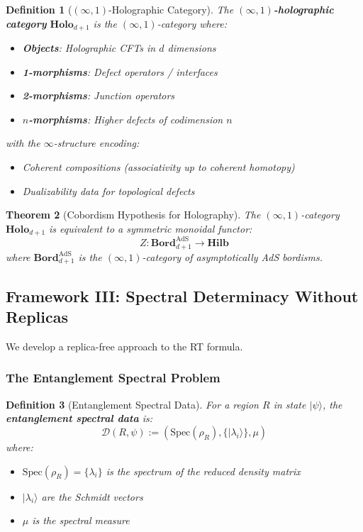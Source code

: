 \documentclass[12pt,a4paper]{article}
\newtheorem{theorem}{Theorem}[section]
\newtheorem{definition}[theorem]{Definition}
\begin{document}
\begin{definition}[$(\infty,1)$-Holographic Category]\label{def:infty-holo}
The \textbf{$(\infty,1)$-holographic category} $\mathbf{Holo}_{d+1}$ is the $(\infty,1)$-category where:
\begin{itemize}
    \item \textbf{Objects}: Holographic CFTs in $d$ dimensions
    \item \textbf{1-morphisms}: Defect operators / interfaces
    \item \textbf{2-morphisms}: Junction operators
    \item \textbf{$n$-morphisms}: Higher defects of codimension $n$
\end{itemize}
with the $\infty$-structure encoding:
\begin{itemize}
    \item Coherent compositions (associativity up to coherent homotopy)
    \item Dualizability data for topological defects
\end{itemize}
\end{definition}

\begin{theorem}[Cobordism Hypothesis for Holography]\label{thm:cobordism-holo}
The $(\infty,1)$-category $\mathbf{Holo}_{d+1}$ is equivalent to a symmetric monoidal functor:
\begin{equation}
Z: \mathbf{Bord}_{d+1}^{\text{AdS}} \to \mathbf{Hilb}
\end{equation}
where $\mathbf{Bord}_{d+1}^{\text{AdS}}$ is the $(\infty,1)$-category of asymptotically AdS bordisms.
\end{theorem}

\subsection{Framework III: Spectral Determinacy Without Replicas}

We develop a replica-free approach to the RT formula.

\subsubsection{The Entanglement Spectral Problem}

\begin{definition}[Entanglement Spectral Data]\label{def:ent-spectral}
For a region $R$ in state $|\psi\rangle$, the \textbf{entanglement spectral data} is:
\begin{equation}
\mathcal{D}(R, \psi) := (\text{Spec}(\rho_R), \{|\lambda_i\rangle\}, \mu)
\end{equation}
where:
\begin{itemize}
    \item $\text{Spec}(\rho_R) = \{\lambda_i\}$ is the spectrum of the reduced density matrix
    \item $|\lambda_i\rangle$ are the Schmidt vectors
    \item $\mu$ is the spectral measure
\end{itemize}
\end{definition}
\end{document}
